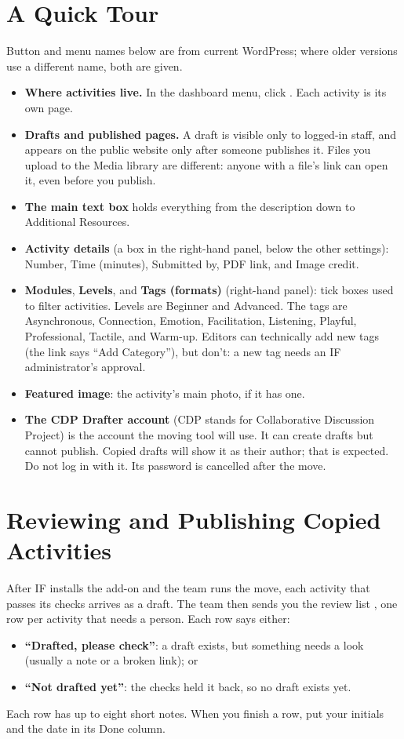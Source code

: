 \section{A Quick Tour}
Button and menu names below are from current WordPress; where older versions use a different name, both are given.
\begin{itemize}
  \item \textbf{Where activities live.} In the dashboard menu, click . Each activity is its own page.
  \item \textbf{Drafts and published pages.} A draft is visible only to logged-in staff, and appears on the public website only after someone publishes it. Files you upload to the Media library are different: anyone with a file's link can open it, even before you publish.
  \item \textbf{The main text box} holds everything from the description down to Additional Resources.
  \item \textbf{Activity details} (a box in the right-hand panel, below the other settings): Number, Time (minutes), Submitted by, PDF link, and Image credit.
  \item \textbf{Modules}, \textbf{Levels}, and \textbf{Tags (formats)} (right-hand panel): tick boxes used to filter activities. Levels are Beginner and Advanced. The tags are Asynchronous, Connection, Emotion, Facilitation, Listening, Playful, Professional, Tactile, and Warm-up. Editors can technically add new tags (the link says ``Add Category''), but don't: a new tag needs an IF administrator's approval.
  \item \textbf{Featured image}: the activity's main photo, if it has one.
  \item \textbf{The CDP Drafter account} (CDP stands for Collaborative Discussion Project) is the account the moving tool will use. It can create drafts but cannot publish. Copied drafts will show it as their author; that is expected. Do not log in with it. Its password is cancelled after the move.
\end{itemize}

\section{Reviewing and Publishing Copied Activities}
After IF installs the add-on and the team runs the move, each activity that passes its checks arrives as a draft. The team then sends you the review list , one row per activity that needs a person. Each row says either:
\begin{itemize}
  \item \textbf{``Drafted, please check''}: a draft exists, but something needs a look (usually a note or a broken link); or
  \item \textbf{``Not drafted yet''}: the checks held it back, so no draft exists yet.
\end{itemize}
Each row has up to eight short notes. When you finish a row, put your initials and the date in its Done column.

